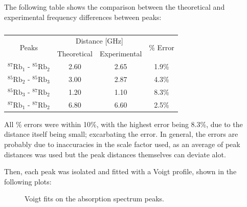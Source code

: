 \documentclass{article}
\begin{document}
\pagebreak{}

The following table shows the comparison between the theoretical and experimental frequency differences between peaks:

\begin{table}[h]
    \centering
    \begin{tabular}{|c|cc|c|}
    \hline
    \multirow{2}{*}{Peaks} & \multicolumn{2}{c|}{Distance {[}GHz{]}} & \multirow{2}{*}{\% Error} \\ \cline{2-3}
                                            & \multicolumn{1}{c|}{Theoretical} & Experimental &       \\ \hline
    $^{87}\text{Rb}_1$ - $^{85}\text{Rb}_2$ & \multicolumn{1}{c|}{2.60}        & 2.65         & 1.9\% \\ \hline
    $^{85}\text{Rb}_2$ - $^{85}\text{Rb}_3$ & \multicolumn{1}{c|}{3.00}        & 2.87         & 4.3\% \\ \hline
    $^{85}\text{Rb}_3$ - $^{87}\text{Rb}_2$ & \multicolumn{1}{c|}{1.20}        & 1.10         & 8.3\%  \\ \hline
    $^{87}\text{Rb}_1$ - $^{87}\text{Rb}_2$ & \multicolumn{1}{c|}{6.80}        & 6.60         & 2.5\% \\ \hline
    \end{tabular}
    \caption{}
    \label{tab:frequency_differences}
\end{table}

All \% errors were within 10\%, with the highest error being 8.3\%, due to the distance itself being small; excarbating the error. In general, the errors are probably due to inaccuracies in the scale factor used, as an average of peak distances was used but the peak distances themselves can deviate alot.

Then, each peak was isolated and fitted with a Voigt profile, shown in the following plots:

\begin{figure}[h]
    \centering
    \begin{subfigure}{0.49\textwidth}
        \centering
        \scalebox{0.49}{}
        \caption{}
        \label{fig:voigt_fit_1}
    \end{subfigure}
    \begin{subfigure}{0.49\textwidth}
        \centering
        \scalebox{0.49}{}
        \caption{}
        \label{fig:voigt_fit_2}
    \end{subfigure}
    \begin{subfigure}{0.49\textwidth}
        \centering
        \scalebox{0.49}{}
        \caption{}
        \label{fig:voigt_fit_3}
    \end{subfigure}
    \begin{subfigure}{0.49\textwidth}
        \centering
        \scalebox{0.49}{}
        \caption{}
        \label{fig:voigt_fit_4}
    \end{subfigure}
    \caption{Voigt fits on the absorption spectrum peaks.}
    \label{fig:voigt_fits}
\end{figure}
\end{document}
